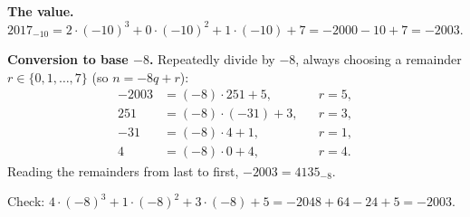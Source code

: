 \textbf{The value.} $2017_{-10}=2\cdot(-10)^3+0\cdot(-10)^2+1\cdot(-10)+7=-2000-10+7=-2003$.

\textbf{Conversion to base $-8$.} Repeatedly divide by $-8$, always choosing a remainder $r\in\{0,1,\dots,7\}$ (so $n=-8q+r$):
\[
\begin{aligned}
-2003&=(-8)\cdot251+5, && r=5,\\
251&=(-8)\cdot(-31)+3, && r=3,\\
-31&=(-8)\cdot4+1, && r=1,\\
4&=(-8)\cdot0+4, && r=4.
\end{aligned}
\]
Reading the remainders from last to first, $-2003=\boxed{4135_{-8}}$.

Check: $4\cdot(-8)^3+1\cdot(-8)^2+3\cdot(-8)+5=-2048+64-24+5=-2003$.

